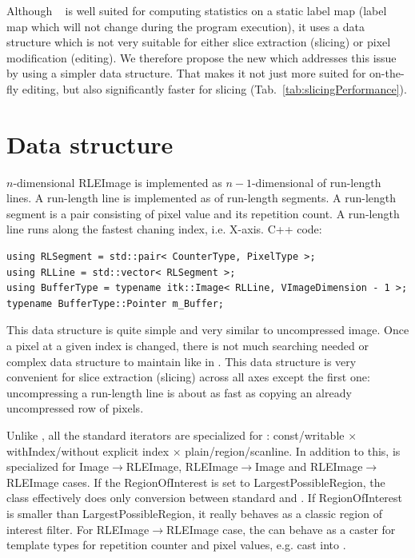 \documentclass{InsightArticle}
\begin{document}
Although ~\cite{Lehmann2007} is well suited for
computing statistics on a static label map
(label map which will not change during the program execution),
it uses a data structure which is not very suitable for either
slice extraction (slicing) or pixel modification (editing).
We therefore propose the new  which addresses
this issue by using a simpler data structure.
That makes it not just more suited for on-the-fly editing,
but also significantly faster for slicing (Tab.~\ref{tab:slicingPerformance}).


\section{Data structure}

$n$-dimensional RLEImage is implemented as $n-1$-dimensional  of run-length lines.
A run-length line is implemented as  of run-length segments.
A run-length segment is a pair consisting of pixel value and its repetition count.
A run-length line runs along the fastest chaning index, i.e. X-axis. C++ code:

\begin{verbatim}
using RLSegment = std::pair< CounterType, PixelType >;
using RLLine = std::vector< RLSegment >;
using BufferType = typename itk::Image< RLLine, VImageDimension - 1 >;
typename BufferType::Pointer m_Buffer;
\end{verbatim}

This data structure is quite simple and very similar to uncompressed image.
Once a pixel at a given index is changed, there is not much searching needed
or complex data structure to maintain like in .
This data structure is very convenient for slice extraction (slicing)
across all axes except the first one: uncompressing a run-length line
is about as fast as copying an already uncompressed row of pixels.

Unlike , all the standard iterators are specialized for :
const/\-writable $\times$ withIndex/\-without explicit index $\times$ plain/\-region/\-scanline.
In addition to this,  is specialized for
Image$\rightarrow$RLEImage, RLEImage$\rightarrow$Image and RLEImage$\rightarrow$RLEImage cases.
If the RegionOfInterest is set to LargestPossibleRegion, the class effectively
does only conversion between standard  and .
If RegionOfInterest is smaller than LargestPossibleRegion,
it really behaves as a classic region of interest filter.
For RLEImage$\rightarrow$RLEImage case, the 
can behave as a caster for template types for repetition counter and pixel values,
e.g. cast  into .
\end{document}
